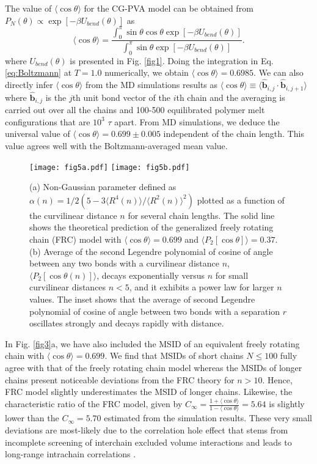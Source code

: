 \documentclass[pre,showpacs,notitlepage,twocolumn]{revtex4-1}
\begin{document}
The   value of  $ \langle \cos \theta \rangle $ for the CG-PVA model  can be obtained from $P_N(\theta) \propto \exp[-\beta U_{bend} (\theta)] $  as
\begin{equation}
 \langle \cos \theta \rangle=   \frac{\int_{0}^{\pi} \sin \theta \cos \theta \exp[-\beta U_{bend} (\theta)] }{\int_{0}^{\pi} \sin \theta  \exp[-\beta U_{bend} (\theta)]}.        
\end{equation}
%
where $U_{bend} (\theta)$ is presented in Fig. \ref{fig1}.
Doing the  integration  in Eq. \eqref{eq:Boltzmann} at $T=1.0$ numerically, we obtain 
 $  \langle \cos \theta \rangle= 0.6985$.    We can also  directly  infer $ \langle \cos \theta \rangle $ from  the MD simulations results as $ \langle \cos \theta \rangle \equiv \langle \widehat{\mathbf{b}}_{i,j} \cdot \widehat{\mathbf{b}}_{i,j+1}  \rangle $ where  $\widehat{\mathbf{b}}_{i,j}$  is  the  $j$th unit bond vector   of the  $i$th chain and the averaging is carried out over all the chains and 100-500 equilibrated polymer melt configurations that are $10^3$ $\tau$ apart.
From MD simulations, we deduce the universal value of $ \langle \cos \theta \rangle=0.699 \pm 0.005 $ independent of the chain length.
This value  agrees well with the Boltzmann-averaged mean value.

%
  \begin{figure*}[t]
\texttt{[image: fig5a.pdf]}
\texttt{[image: fig5b.pdf]}
 \caption{  (a) Non-Gaussian parameter defined as $\alpha(n)=1/2(5-3\langle R^4(n) \rangle /  \langle R^2(n) \rangle ^2 ) $  plotted as a
function of the  curvilinear distance $n$ for several chain lengths. The solid line shows the theoretical prediction of  the generalized freely rotating
chain (FRC) model with $ \langle \cos \theta \rangle=0.699 $ and $\langle P_2[ \cos \theta]\rangle=0.37$. (b) Average of the second Legendre polynomial  of cosine of
angle between any two bonds with a curvilinear distance $n$, $\langle P_2[ \cos \theta(n)]\rangle $,   decays exponentially versus $n$ for small  curvilinear distances $n<5$, and it exhibits a power law for larger $n$ values.  
The inset shows that the average of second Legendre polynomial of cosine of angle between two bonds  with a separation   $r$  oscillates strongly and decays rapidly with distance.
   }
\label{fig5} 
\end{figure*}
%
 
In Fig. \ref{fig3}a, we have also included the MSID of an equivalent freely rotating chain with $ \langle \cos \theta \rangle=0.699$.  We find that   MSIDs of short chains $N\le 100$ 
fully agree with that of the  freely rotating chain  model  whereas   the MSIDs of longer chains present noticeable  deviations from the FRC theory for $n >10 $.
Hence, FRC model slightly underestimates the  MSID of longer chains. Likewise, the characteristic ratio of  the FRC model, given by
$C_{\infty}=\frac{1+\langle \cos \theta \rangle}{1-\langle \cos \theta \rangle}=5.64$   is slightly lower than the $C_{\infty}=5.70$ estimated from the simulation results.   
These very small deviations are most-likely due to the correlation hole effect that stems from
incomplete screening of  interchain excluded volume interactions and leads to long-range intrachain correlations \cite{polymerDeGennes}. 
 
\end{document}
